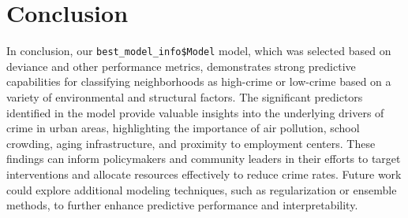 \documentclass[
  11pt]{article}
\begin{document}
\section{Conclusion}\label{conclusion}

In conclusion, our \texttt{best\_model\_info\$Model} model, which was
selected based on deviance and other performance metrics, demonstrates
strong predictive capabilities for classifying neighborhoods as
high-crime or low-crime based on a variety of environmental and
structural factors. The significant predictors identified in the model
provide valuable insights into the underlying drivers of crime in urban
areas, highlighting the importance of air pollution, school crowding,
aging infrastructure, and proximity to employment centers. These
findings can inform policymakers and community leaders in their efforts
to target interventions and allocate resources effectively to reduce
crime rates. Future work could explore additional modeling techniques,
such as regularization or ensemble methods, to further enhance
predictive performance and interpretability.
\end{document}
